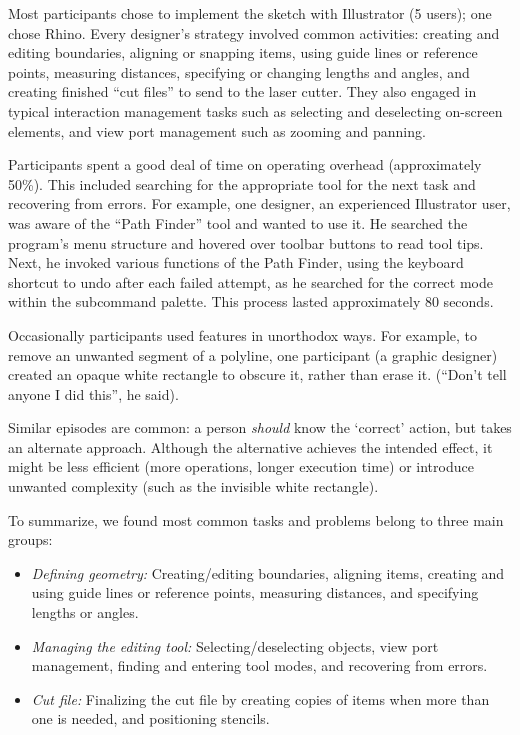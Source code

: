 \documentclass{article}
\begin{document}
Most participants chose to implement the sketch with Illustrator (5
users); one chose Rhino. Every designer's strategy involved common
activities: creating and editing boundaries, aligning or snapping
items, using guide lines or reference points, measuring distances,
specifying or changing lengths and angles, and creating finished ``cut
files'' to send to the laser cutter.  They also engaged in typical
interaction management tasks such as selecting and deselecting
on-screen elements, and view port management such as zooming and
panning.

Participants spent a good deal of time on operating overhead
(approximately 50\%). This included searching for the appropriate tool
for the next task and recovering from errors. For example, one
designer, an experienced Illustrator user, was aware of the ``Path
Finder'' tool and wanted to use it. He searched the program's menu
structure and hovered over toolbar buttons to read tool tips. Next, he
invoked various functions of the Path Finder, using the keyboard
shortcut to undo after each failed attempt, as he searched for the
correct mode within the subcommand palette. This process lasted
approximately 80 seconds.

Occasionally participants used features in unorthodox ways. For
example, to remove an unwanted segment of a polyline, one participant
(a graphic designer) created an opaque white rectangle to obscure it,
rather than erase it. (``Don't tell anyone I did this'', he said).

Similar episodes are common: a person \textit{should} know the
`correct' action, but takes an alternate approach. Although the
alternative achieves the intended effect, it might be less efficient
(more operations, longer execution time) or introduce unwanted
complexity (such as the invisible white rectangle).

To summarize, we found most common tasks and problems belong to three
main groups:

\begin{itemize}
\item \textit{Defining geometry:} Creating/editing boundaries,
  aligning items, creating and using guide lines or reference points,
  measuring distances, and specifying lengths or angles.
\item \textit{Managing the editing tool:} Selecting/deselecting
  objects, view port management, finding and entering tool modes, and
  recovering from errors.
\item \textit{Cut file:} Finalizing the cut file by creating copies of
  items when more than one is needed, and positioning stencils.
\end{itemize}
\end{document}
